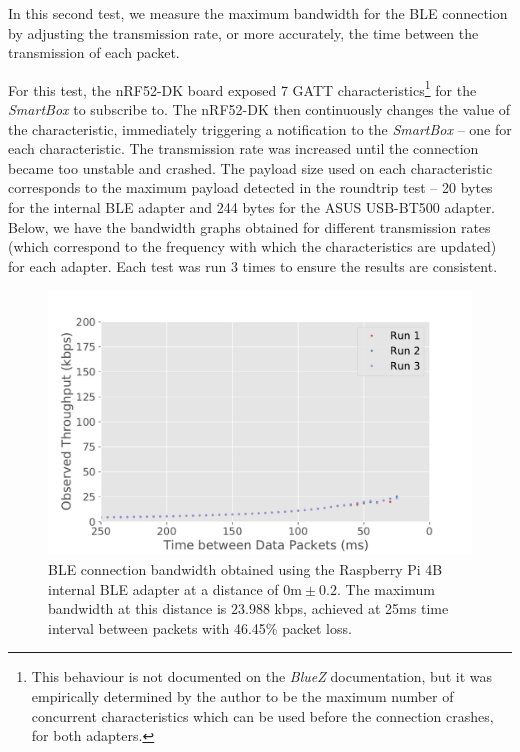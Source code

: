 In this second test, we measure the maximum bandwidth for the \acs{BLE} connection by adjusting the transmission rate, or more accurately, the time between the transmission of each packet. 

For this test, the nRF52-DK board exposed 7 \acs{GATT} characteristics\footnote{This behaviour is not documented on the \textit{BlueZ} documentation, but it was empirically determined by the author to be the maximum number of concurrent characteristics which can be used before the connection crashes, for both adapters.} for the \textit{SmartBox} to subscribe to. The nRF52-DK then continuously changes the value of the characteristic, immediately triggering a notification to the \textit{SmartBox} -- one for each characteristic. The transmission rate was increased until the connection became too unstable and crashed. The payload size used on each characteristic corresponds to the maximum payload detected in the roundtrip test -- 20 bytes for the internal \acs{BLE} adapter and 244 bytes for the ASUS USB-BT500 adapter.
Below, we have the bandwidth graphs obtained for different transmission rates (which correspond to the frequency with which the characteristics are updated) for each adapter. Each test was run 3 times to ensure the results are consistent.


\begin{figure}[H]
    \centering
    \includegraphics[width=0.75\linewidth]{images/ble-bandwidth-hci1-0cm.pdf}
    \caption[\acs{BLE} connection bandwidth obtained using the ASUS USB-BT500 adapter at a distance of 0m.]
    {\acs{BLE} connection bandwidth obtained using the Raspberry Pi 4B internal \acs{BLE} adapter at a distance of $0\text{m} \pm 0.2$. The maximum bandwidth at this distance is $23.988$ kbps, achieved at 25ms time interval between packets with 46.45\% packet loss.}
    \label{fig:ble-bandwidth-hci1-0m}
\end{figure}


